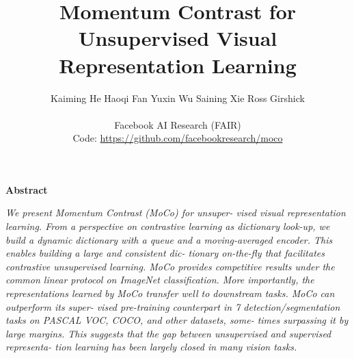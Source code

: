 \documentclass[10pt,twocolumn]{article}  %
\date{}  %
\title{Momentum Contrast for Unsupervised Visual Representation Learning}
\author{Kaiming He \quad Haoqi Fan \quad Yuxin Wu \quad Saining Xie \quad Ross Girshick \\
\\
Facebook AI Research (FAIR) \\
Code: \href{https://github.com/facebookresearch/moco}{\color{myPink}https://github.com/facebookresearch/moco}
}
\renewenvironment{abstract}{%
    \begin{center}%
        \normalfont\bfseries\large Abstract%
    \end{center}%
    \begin{minipage}{0.5\textwidth}%
    \fontsize{10pt}{12pt}\selectfont%
    \noindent%
    \itshape%
}
{%
    \end{minipage}%
}
\begin{document}
\maketitle

\begin{abstract}
    \fontsize{10pt}{12pt}\selectfont %
    \noindent %
    \itshape \hspace{1em} We present Momentum Contrast (MoCo) for unsuper-
    vised visual representation learning. From a perspective on
    contrastive learning \cite{29_hadsell2006dimensionality} as dictionary look-up, we build
    a dynamic dictionary with a queue and a moving-averaged
    encoder. This enables building a large and consistent dic-
    tionary on-the-ﬂy that facilitates contrastive unsupervised
    learning. MoCo provides competitive results under the
    common linear protocol on ImageNet classiﬁcation. More
    importantly, the representations learned by MoCo transfer
    well to downstream tasks. MoCo can outperform its super-
    vised pre-training counterpart in 7 detection/segmentation
    tasks on PASCAL VOC, COCO, and other datasets, some-
    times surpassing it by large margins. This suggests that
    the gap between unsupervised and supervised representa-
    tion learning has been largely closed in many vision tasks.
\end{abstract}

\end{document}
